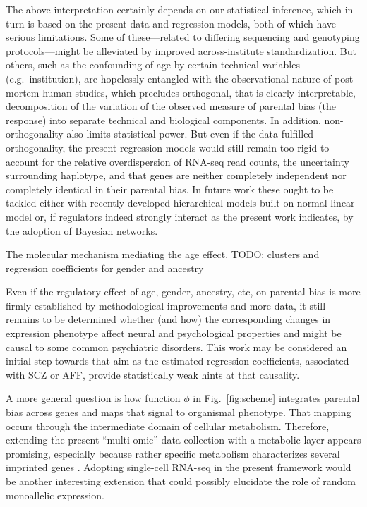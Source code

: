 \documentclass[letterpaper]{article}
\begin{document}
The above interpretation certainly depends on our statistical inference, which
in turn is based on the present data and regression models, both of which have
serious limitations.  Some of these---related to differing sequencing and
genotyping protocols---might be alleviated by improved across-institute
standardization.  But others, such as the confounding of age by certain
technical variables (e.g.~institution), are hopelessly entangled with the
observational nature of post mortem human studies, which precludes orthogonal,
that is clearly interpretable, decomposition of the variation of the observed
measure of parental bias (the response) into separate technical and biological
components.  In addition, non-orthogonality also limits statistical power.  But even
if the data fulfilled orthogonality, the present regression models would still
remain too rigid to account for the relative overdispersion of RNA-seq read
counts, the uncertainty surrounding haplotype, and that genes are neither
completely independent nor completely identical in their parental bias.  In
future work these ought to be tackled either with recently developed
hierarchical models built on normal linear model \cite{Perez2015,Law2014} or,
if regulators indeed strongly interact as the present work indicates, by the
adoption of Bayesian networks.

The molecular mechanism mediating the age effect.  TODO: clusters and regression
coefficients for gender and ancestry

Even if the regulatory effect of age, gender, ancestry, etc, on parental bias
is more firmly established by methodological improvements and more data, it
still remains to be determined whether (and how) the corresponding changes in
expression phenotype affect neural and psychological properties and might be
causal to some common psychiatric disorders.  This work may be considered an
initial step towards that aim as the estimated regression coefficients,
associated with SCZ or AFF, provide statistically weak hints at that
causality.

A more general question is how function \(\phi\) in Fig.~\ref{fig:scheme}
integrates parental bias across genes and maps that signal to organismal
phenotype.  That mapping occurs through the intermediate domain of cellular
metabolism.  Therefore, extending the present ``multi-omic'' data collection
with a metabolic layer appears promising, especially because rather specific
metabolism characterizes several imprinted genes \cite{Tucci2016,Peters2014}.
Adopting single-cell RNA-seq in the present framework would be another
interesting extension that could possibly elucidate the role of random
monoallelic expression.
\end{document}
